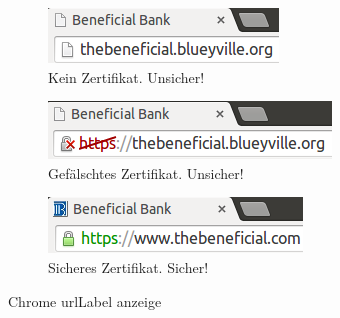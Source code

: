 \begin{figure}[H]
  \begin{subfigure}[b]{.30\linewidth}
    \centering
    \includegraphics[width=0.9\linewidth]{images/https-chrome-none.png}
    \caption{Kein Zertifikat. Unsicher!}
    \label{fig:phishing:angriffvorbereiten:angriffsvektoren:fakecertificates:chrome:none}
  \end{subfigure}%
    \begin{subfigure}[b]{.30\linewidth}
      \centering
      \includegraphics[width=0.9\linewidth]{images/https-chrome-fake.png}
      \caption{Gefälschtes Zertifikat. Unsicher!}
      \label{fig:phishing:angriffvorbereiten:angriffsvektoren:fakecertificates:chrome:fake}
    \end{subfigure}
	\begin{subfigure}[b]{.30\linewidth}
		\centering
		\includegraphics[width=0.9\linewidth]{images/https-chrome-secure.png}
		\caption{Sicheres Zertifikat. Sicher!}
		\label{fig:phishing:angriffvorbereiten:angriffsvektoren:fakecertificates:chrome:secure}
	\end{subfigure}
  \caption{Chrome \Gls{urlLabel} anzeige}
  \label{fig:phishing:angriffvorbereiten:angriffsvektoren:fakecertificates:chrome}
\end{figure}

